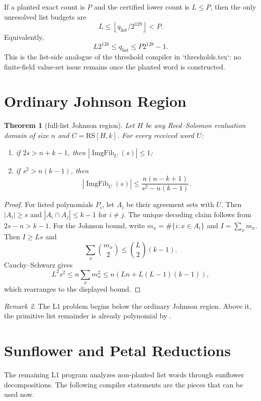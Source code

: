 \documentclass[11pt]{article}
\newtheorem{theorem}{Theorem}[section]
\theoremstyle{definition}
\theoremstyle{remark}
\newtheorem{remark}[theorem]{Remark}
\newcommand{\RS}{\mathrm{RS}}
\newcommand{\ImgFib}{\operatorname{ImgFib}}
\newcommand{\floor}[1]{\left\lfloor #1\right\rfloor}
\begin{document}
If a planted exact count is $P$ and the certified lower count is $L\le P$, then
the only unresolved list budgets are
\[
        L\le \floor{q_{\mathrm{list}}/2^{128}}<P.
\]
Equivalently,
\[
        L2^{128}\le q_{\mathrm{list}}\le P2^{128}-1.
\]
This is the list-side analogue of the threshold compiler in
`thresholds.tex`: no finite-field value-set issue remains once the planted word
is constructed.

\section{Ordinary Johnson Region}

\begin{theorem}[full-list Johnson region]\label{thm:johnson}
Let $H$ be any Reed--Solomon evaluation domain of size $n$ and
$C=\RS[H,k]$.  For every received word $U$:
\begin{enumerate}[label=(\roman*)]
        \item if $2s>n+k-1$, then $|\ImgFib_U(s)|\le1$;
        \item if $s^2>n(k-1)$, then
        \[
        |\ImgFib_U(s)|
        \le
        \frac{n(n-k+1)}{s^2-n(k-1)}.
        \]
\end{enumerate}
\end{theorem}

\begin{proof}
For listed polynomials $P_i$, let $A_i$ be their agreement sets with $U$.
Then $|A_i|\ge s$ and $|A_i\cap A_j|\le k-1$ for $i\ne j$.  The unique
decoding claim follows from $2s-n>k-1$.  For the Johnson bound, write
$m_x=\#\{i:x\in A_i\}$ and $I=\sum_x m_x$.  Then $I\ge Ls$ and
\[
\sum_x\binom{m_x}{2}\le\binom L2(k-1).
\]
Cauchy--Schwarz gives
\[
L^2s^2\le n\sum_x m_x^2
\le n(Ln+L(L-1)(k-1)),
\]
which rearranges to the displayed bound.
\end{proof}

\begin{remark}
The L1 problem begins below the ordinary Johnson region.  Above it, the
primitive list remainder is already polynomial by .
\end{remark}

\section{Sunflower and Petal Reductions}

The remaining L1 program analyzes non-planted list words through sunflower
decompositions.  The following compiler statements are the pieces that can be
used now.
\end{document}
